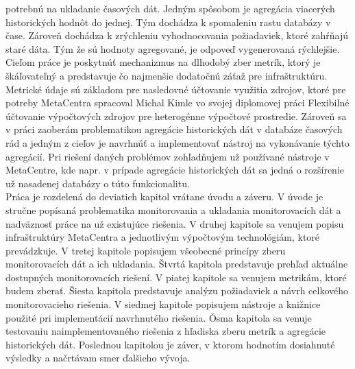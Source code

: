 \documentclass[printed,11pt,twoside,color,cover,table]{fithesis3}
\begin{document}
potrebnú na ukladanie časových dát. Jedným spôsobom je agregácia viacerých historických hodnôt do jednej. Tým dochádza k spomaleniu rastu
databázy v čase. Zároveň dochádza k zrýchleniu vyhodnocovania požiadaviek, ktoré zahŕňajú staré dáta. Tým že sú hodnoty agregované,
je odpoveď vygenerovaná rýchlejšie.
\\Cieľom práce je poskytnúť mechanizmus na dlhodobý zber metrík, ktorý je škáľovateľný a predstavuje čo najmenšie dodatočnú záťaž
pre infraštruktúru. Metrické údaje sú základom pre nasledovné účtovanie využitia zdrojov, ktoré pre potreby MetaCentra spracoval
Michal Kimle vo svojej diplomovej práci Flexibilné účtovanie výpočtových zdrojov pre heterogénne výpočtové prostredie\cite{uctovanie}.
Zároveň sa v práci zaoberám problematikou agregácie historických dát v databáze časových rád a jedným z cieľov je navrhnúť a 
implementovať nástroj na vykonávanie týchto agregácií. Pri riešení daných problémov zohľadňujem už používané nástroje v MetaCentre,
kde napr. v prípade agregácie historických dát sa jedná o rozšírenie už nasadenej databázy o túto funkcionalitu.
\\Práca je rozdelená do deviatich kapitol vrátane úvodu a záveru. V úvode je stručne popísaná problematika monitorovania a ukladania
monitorovacích dát a nadväznosť práce na už existujúce riešenia. V druhej kapitole sa venujem popisu infraštruktúry MetaCentra a 
jednotlivým výpočtovým technológiám, ktoré prevádzkuje. V tretej kapitole popisujem všeobecné princípy zberu monitorovacích dát
a ich ukladania. Štvrtá kapitola predstavuje prehľad aktuálne dostupných monitorovacích riešení. V piatej kapitole sa venujem
metrikám, ktoré budem zberať. Šiesta kapitola predstavuje analýzu požiadaviek a návrh celkového monitorovacieho riešenia.
V siedmej kapitole popisujem nástroje a knižnice použité pri implementácií navrhnutého riešenia. Ǒsma kapitola sa venuje
testovaniu naimplementovaného riešenia z hľadiska zberu metrík a agregácie historických dát. Poslednou kapitolou
je záver, v ktorom hodnotím dosiahnuté výsledky a načrtávam smer ďalšieho vývoja.
\end{document}
